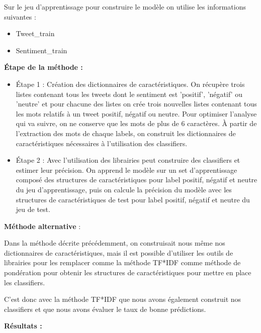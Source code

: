 \par Sur le jeu d'apprentissage pour construire le modèle on utilise les informations suivantes : \\
\begin{itemize}
	\item Tweet\_train
	\item Sentiment\_train \\
\end{itemize}


\par \textbf{Étape de la méthode :} \\
\begin{itemize}
	\item Étape 1 : Création des dictionnaires de caractéristiques. On récupère trois listes contenant tous les tweets dont le sentiment est 'positif', 'négatif' ou 'neutre' et pour chacune des listes on crée trois nouvelles listes contenant tous les mots relatifs à un tweet positif, négatif ou neutre. Pour optimiser l'analyse qui va suivre, on ne conserve que les mots de plus de 6 caractères. À partir de l'extraction des mots de chaque labels, on construit les dictionnaires de caractéristiques nécessaires à l'utilisation des classifiers. \\
	\item Étape 2 : Avec l'utilisation des librairies peut construire des classifiers et estimer leur précision. On apprend le modèle sur un set d'apprentissage composé des structures de caractéristiques pour label positif, négatif et neutre du jeu d'apprentissage, puis on calcule la précision du modèle avec les structures de caractéristiques de test pour label positif, négatif et neutre du jeu de test. \\
\end{itemize}

\par \textbf{Méthode alternative }: \\
\par Dans la méthode décrite précédemment, on construisait nous même nos dictionnaires de caractéristiques, mais il est possible d'utiliser les outils de librairies pour les remplacer comme la méthode TF*IDF comme méthode de pondération pour obtenir les structures de caractéristiques pour mettre en place les classifiers.
\par C'est donc avec la méthode TF*IDF que nous avons également construit nos classifiers et que nous avons évaluer le taux de bonne prédictions.

\par \textbf{Résultats :} \\


